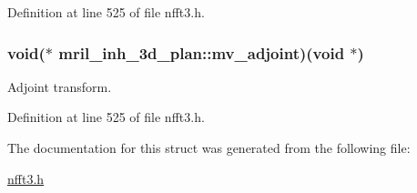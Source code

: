 Definition at line 525 of file nfft3.\-h.

\hypertarget{structmril__inh__3d__plan_a2d189c2b7f8b5bf635cce01354ef253e}{
\subsubsection[{mv\-\_\-adjoint}]{\setlength{\rightskip}{0pt plus 5cm}void($\ast$ mril\-\_\-inh\-\_\-3d\-\_\-plan\-::mv\-\_\-adjoint)(void $\ast$)}}\label{structmril__inh__3d__plan_a2d189c2b7f8b5bf635cce01354ef253e}


Adjoint transform. 



Definition at line 525 of file nfft3.\-h.



The documentation for this struct was generated from the following file\-:\begin{DoxyCompactItemize}
\item 
\hyperlink{nfft3_8h}{nfft3.\-h}\end{DoxyCompactItemize}
